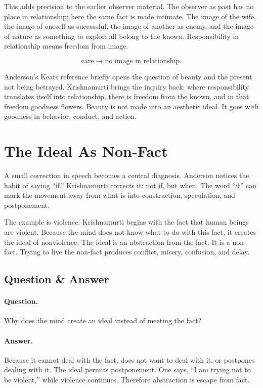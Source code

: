 \documentclass[11pt,oneside]{book}
\begin{document}
This adds precision to the earlier observer material. The observer as past has no place in relationship; here the same fact is made intimate. The image of the wife, the image of oneself as successful, the image of another as enemy, and the image of nature as something to exploit all belong to the known. Responsibility in relationship means freedom from image.

\begin{equation}
\text{care}
\longrightarrow
\text{no image in relationship}.
\end{equation}

Anderson's Keats reference briefly opens the question of beauty and the present not being betrayed. Krishnamurti brings the inquiry back: where responsibility translates itself into relationship, there is freedom from the known, and in that freedom goodness flowers. Beauty is not made into an aesthetic ideal. It goes with goodness in behavior, conduct, and action.

\section{The Ideal As Non-Fact}

A small correction in speech becomes a central diagnosis. Anderson notices the habit of saying ``if.'' Krishnamurti corrects it: not if, but when. The word ``if'' can mark the movement away from what is into construction, speculation, and postponement.

The example is violence. Krishnamurti begins with the fact that human beings are violent. Because the mind does not know what to do with this fact, it creates the ideal of nonviolence. The ideal is an abstraction from the fact. It is a non-fact. Trying to live the non-fact produces conflict, misery, confusion, and delay.

\subsection{Question \& Answer}

\paragraph{Question.}
Why does the mind create an ideal instead of meeting the fact?

\paragraph{Answer.}
Because it cannot deal with the fact, does not want to deal with it, or postpones dealing with it. The ideal permits postponement. One says, ``I am trying not to be violent,'' while violence continues. Therefore abstraction is escape from fact.
\end{document}
